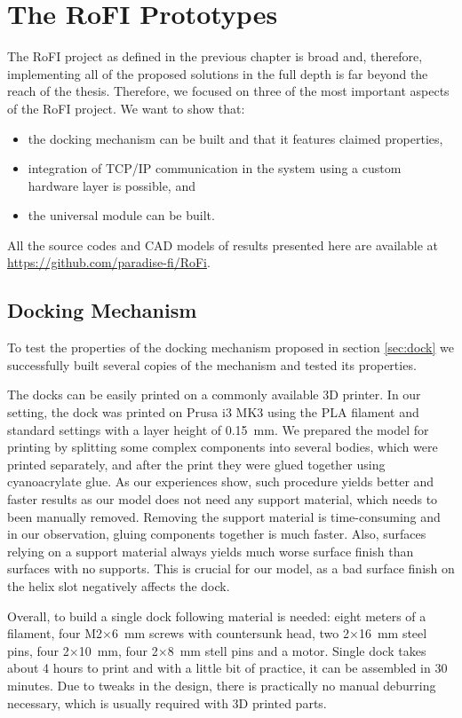 \chapter{The RoFI Prototypes}\label{chap:prototypes}

The RoFI project as defined in the previous chapter is broad and, therefore,
implementing all of the proposed solutions in the full depth is far beyond the
reach of the thesis. Therefore, we focused on three of the most important
aspects of the RoFI project. We want to show that:
\begin{itemize}
    \item the docking mechanism can be built and that it features claimed
    properties,
    \item integration of TCP/IP communication in the system using a custom
    hardware layer is possible, and
    \item the universal module can be built.
\end{itemize}

All the source codes and CAD models of results presented here are available at
\url{https://github.com/paradise-fi/RoFi}.

\section{Docking Mechanism}

To test the properties of the docking mechanism proposed in section
\ref{sec:dock} we successfully built several copies of the mechanism and tested
its properties.

The docks can be easily printed on a commonly available 3D printer. In our
setting, the dock was printed on Prusa i3 MK3 using the PLA filament and
standard settings with a layer height of 0.15~mm. We prepared the model for
printing by splitting some complex components into several bodies, which
were printed separately, and after the print they were glued together using
cyanoacrylate glue. As our experiences show, such procedure yields better and
faster results as our model does not need any support material, which needs to
been manually removed. Removing the support material is time-consuming and in
our observation, gluing components together is much faster. Also, surfaces
relying on a support material always yields much worse surface finish than
surfaces with no supports. This is crucial for our model, as a bad surface
finish on the helix slot negatively affects the dock.

Overall, to build a single dock following material is needed: eight meters of a
filament, four M2$\times$6~mm screws with countersunk head, two 2$\times$16~mm
steel pins, four 2$\times$10~mm, four 2$\times$8~mm stell pins and a motor.
Single dock takes about 4 hours to print and with a little bit of practice, it
can be assembled in 30 minutes. Due to tweaks in the design, there is
practically no manual deburring necessary, which is usually required with 3D
printed parts.

